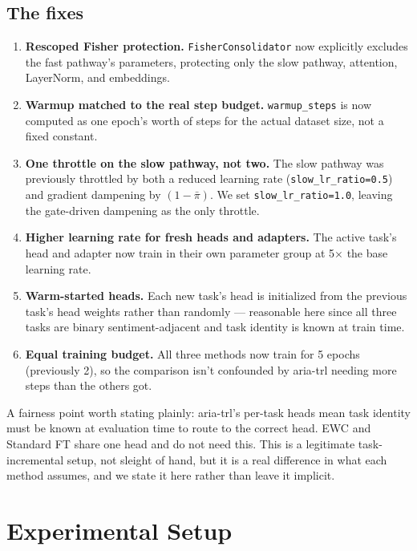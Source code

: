 \documentclass[10pt,twocolumn]{article}
\begin{document}
\subsection{The fixes}

\begin{enumerate}
\item \textbf{Rescoped Fisher protection.} \texttt{FisherConsolidator} now
  explicitly excludes the fast pathway's parameters, protecting only the
  slow pathway, attention, LayerNorm, and embeddings.
\item \textbf{Warmup matched to the real step budget.} \texttt{warmup\_steps}
  is now computed as one epoch's worth of steps for the actual dataset size,
  not a fixed constant.
\item \textbf{One throttle on the slow pathway, not two.} The slow
  pathway was previously throttled by both a reduced learning rate
  (\texttt{slow\_lr\_ratio=0.5}) and gradient dampening by $(1-\bar\pi)$.
  We set \texttt{slow\_lr\_ratio=1.0}, leaving the gate-driven dampening as
  the only throttle.
\item \textbf{Higher learning rate for fresh heads and adapters.} The
  active task's head and adapter now train in their own parameter group at
  5$\times$ the base learning rate.
\item \textbf{Warm-started heads.} Each new task's head is initialized
  from the previous task's head weights rather than randomly — reasonable
  here since all three tasks are binary sentiment-adjacent and task
  identity is known at train time.
\item \textbf{Equal training budget.} All three methods now train for 5
  epochs (previously 2), so the comparison isn't confounded by aria-trl
  needing more steps than the others got.
\end{enumerate}

A fairness point worth stating plainly: aria-trl's per-task heads mean task
identity must be known at evaluation time to route to the correct head. EWC
and Standard FT share one head and do not need this. This is a legitimate
task-incremental setup, not sleight of hand, but it is a real difference in
what each method assumes, and we state it here rather than leave it implicit.

\section{Experimental Setup}
\end{document}
